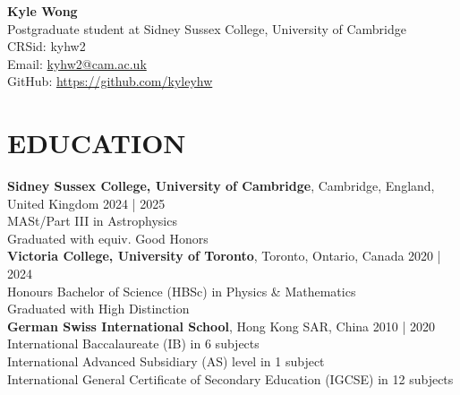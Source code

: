 \documentclass[a4paper,10pt]{extarticle}
\begin{document}
\pagestyle{fancy}
\renewcommand{\headrulewidth}{0pt}
\fancyhead{}
\fancyhead[R]{\textit{\monthyeardate\today}}
\thispagestyle{empty} %

\begin{flushleft}
\textbf{\LARGE Kyle Wong}\\[2pt] %
Postgraduate student at Sidney Sussex College, University of Cambridge
\\ {CRSid: kyhw2} 
\\ Email: \href{mailto:kyhw2@cam.ac.uk}{kyhw2@cam.ac.uk} %
\\ GitHub: \url{https://github.com/kyleyhw}
\end{flushleft}

\section*{EDUCATION}
\textbf{Sidney Sussex College, University of Cambridge}, Cambridge, England, United Kingdom \hfill 2024 | 2025\\
MASt/Part III in Astrophysics\\
Graduated with equiv. Good Honors\\



\textbf{Victoria College, University of Toronto}, Toronto, Ontario, Canada \hfill 2020 | 2024\\ %
Honours Bachelor of Science (HBSc) in Physics \& Mathematics\\
Graduated with High Distinction\\


\textbf{German Swiss International School}, Hong Kong SAR, China \hfill 2010 | 2020\\ %
International Baccalaureate (IB) in 6 subjects\\
International Advanced Subsidiary (AS) level in 1 subject\\
International General Certificate of Secondary Education (IGCSE) in 12 subjects

\end{document}
